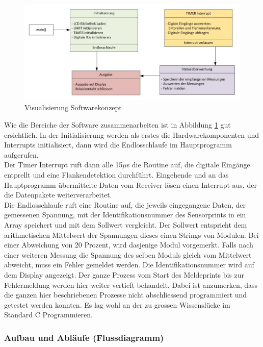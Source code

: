 \begin{figure}[htbp] 
  \centering
     \includegraphics[width=1\textwidth]{graphics/reportboard-software-river}
  \caption{Visualisierung Softwarekonzept}
  \label{fig:reportboard-software-river}
\end{figure}

Wie die Bereiche der Software zusammenarbeiten ist in Abbildung \ref{fig:reportboard-software-river} gut ersichtlich. In der Initialisierung werden als erstes die Hardwarekomponenten und Interrupts initialisiert, dann wird die Endlosschlaufe im Hauptprogramm aufgerufen.\\
Der Timer Interrupt ruft dann alle 15$\mu$s die Routine auf, die digitale Eingänge entprellt und eine Flankendetektion durchführt. Eingehende und an das Hauptprogramm übermittelte Daten vom Receiver lösen einen Interrupt aus, der die Datenpakete weiterverarbeitet.\\
Die Endlosschlaufe ruft eine Routine auf, die jeweils eingegangene Daten, der gemessenen Spannung, mit der Identifikationsnummer des Sensorprints in ein Array speichert und mit dem Sollwert vergleicht. Der Sollwert entspricht dem arithmetischen Mittelwert der Spannungen dieses einen Strings von Modulen. Bei einer Abweichung von 20 Prozent, wird dasjenige Modul vorgemerkt. Falls nach einer weiteren Messung die Spannung des selben Moduls gleich vom Mittelwert abweicht, muss ein Fehler gemeldet werden. Die Identifikationsnummer wird auf dem Display angezeigt. Der ganze Prozess vom Start des Meldeprints bis zur Fehlermeldung werden hier weiter vertieft behandelt. Dabei ist anzumerken, dass die ganzen hier beschriebenen Prozesse nicht abschliessend programmiert und getestet werden konnten. Es lag wohl an der zu grossen Wissenslücke im Standard C Programmieren.

\subsubsection{Aufbau und Abläufe (Flussdiagramm)}
